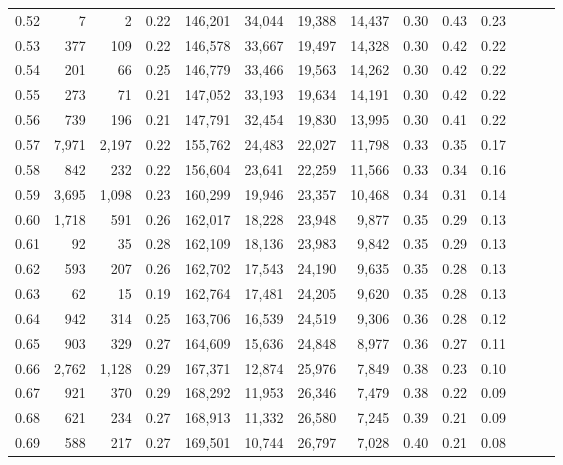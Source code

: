 \begin{tabular}{rrrrrrrrrrrrrr}
0.52 &       7 &      2 &  0.22 &  146,201 &   34,044 &  19,388 &  14,437 &  0.30 &  0.43 &      0.23 \\
0.53 &     377 &    109 &  0.22 &  146,578 &   33,667 &  19,497 &  14,328 &  0.30 &  0.42 &      0.22 \\
0.54 &     201 &     66 &  0.25 &  146,779 &   33,466 &  19,563 &  14,262 &  0.30 &  0.42 &      0.22 \\
0.55 &     273 &     71 &  0.21 &  147,052 &   33,193 &  19,634 &  14,191 &  0.30 &  0.42 &      0.22 \\
0.56 &     739 &    196 &  0.21 &  147,791 &   32,454 &  19,830 &  13,995 &  0.30 &  0.41 &      0.22 \\
0.57 &   7,971 &  2,197 &  0.22 &  155,762 &   24,483 &  22,027 &  11,798 &  0.33 &  0.35 &      0.17 \\
0.58 &     842 &    232 &  0.22 &  156,604 &   23,641 &  22,259 &  11,566 &  0.33 &  0.34 &      0.16 \\
0.59 &   3,695 &  1,098 &  0.23 &  160,299 &   19,946 &  23,357 &  10,468 &  0.34 &  0.31 &      0.14 \\
0.60 &   1,718 &    591 &  0.26 &  162,017 &   18,228 &  23,948 &   9,877 &  0.35 &  0.29 &      0.13 \\
0.61 &      92 &     35 &  0.28 &  162,109 &   18,136 &  23,983 &   9,842 &  0.35 &  0.29 &      0.13 \\
0.62 &     593 &    207 &  0.26 &  162,702 &   17,543 &  24,190 &   9,635 &  0.35 &  0.28 &      0.13 \\
0.63 &      62 &     15 &  0.19 &  162,764 &   17,481 &  24,205 &   9,620 &  0.35 &  0.28 &      0.13 \\
0.64 &     942 &    314 &  0.25 &  163,706 &   16,539 &  24,519 &   9,306 &  0.36 &  0.28 &      0.12 \\
0.65 &     903 &    329 &  0.27 &  164,609 &   15,636 &  24,848 &   8,977 &  0.36 &  0.27 &      0.11 \\
0.66 &   2,762 &  1,128 &  0.29 &  167,371 &   12,874 &  25,976 &   7,849 &  0.38 &  0.23 &      0.10 \\
0.67 &     921 &    370 &  0.29 &  168,292 &   11,953 &  26,346 &   7,479 &  0.38 &  0.22 &      0.09 \\
0.68 &     621 &    234 &  0.27 &  168,913 &   11,332 &  26,580 &   7,245 &  0.39 &  0.21 &      0.09 \\
0.69 &     588 &    217 &  0.27 &  169,501 &   10,744 &  26,797 &   7,028 &  0.40 &  0.21 &      0.08 \\

\end{tabular}

